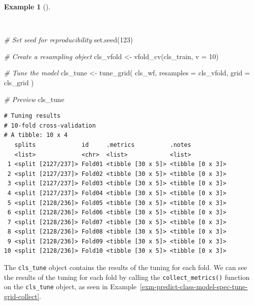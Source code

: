 \documentclass[
  letterpaper,
  krantz1]{latex/krantz-mod}
\newenvironment{Shaded}{\begin{snugshade}}{\end{snugshade}}
\newcommand{\AttributeTok}[1]{\textcolor[rgb]{0.00,0.00,0.00}{#1}}
\newcommand{\CommentTok}[1]{\textcolor[rgb]{0.00,0.00,0.00}{\textit{#1}}}
\newcommand{\DecValTok}[1]{\textcolor[rgb]{0.00,0.00,0.00}{#1}}
\newcommand{\FunctionTok}[1]{\textcolor[rgb]{0.00,0.00,0.00}{#1}}
\newcommand{\NormalTok}[1]{\textcolor[rgb]{0.00,0.00,0.00}{#1}}
\newcommand{\OtherTok}[1]{\textcolor[rgb]{0.00,0.00,0.00}{#1}}
\theoremstyle{definition}
\newtheorem{example}{Example}[chapter]
\theoremstyle{definition}
\theoremstyle{remark}
\begin{document}
\begin{example}[]\protect\hypertarget{exm-predict-class-model-spec-tune-grid-cv}{}\label{exm-predict-class-model-spec-tune-grid-cv}

~

\begin{Shaded}
\begin{Highlighting}[numbers=left,,]
\CommentTok{\# Set seed for reproducibility}
\FunctionTok{set.seed}\NormalTok{(}\DecValTok{123}\NormalTok{)}

\CommentTok{\# Create a resampling object}
\NormalTok{cls\_vfold }\OtherTok{\textless{}{-}} \FunctionTok{vfold\_cv}\NormalTok{(cls\_train, }\AttributeTok{v =} \DecValTok{10}\NormalTok{)}

\CommentTok{\# Tune the model}
\NormalTok{cls\_tune }\OtherTok{\textless{}{-}}
  \FunctionTok{tune\_grid}\NormalTok{(}
\NormalTok{    cls\_wf,}
    \AttributeTok{resamples =}\NormalTok{ cls\_vfold,}
    \AttributeTok{grid =}\NormalTok{ cls\_grid}
\NormalTok{    )}

\CommentTok{\# Preview}
\NormalTok{cls\_tune}
\end{Highlighting}
\end{Shaded}

\begin{verbatim}
# Tuning results
# 10-fold cross-validation 
# A tibble: 10 x 4
   splits             id     .metrics          .notes          
   <list>             <chr>  <list>            <list>          
 1 <split [2127/237]> Fold01 <tibble [30 x 5]> <tibble [0 x 3]>
 2 <split [2127/237]> Fold02 <tibble [30 x 5]> <tibble [0 x 3]>
 3 <split [2127/237]> Fold03 <tibble [30 x 5]> <tibble [0 x 3]>
 4 <split [2127/237]> Fold04 <tibble [30 x 5]> <tibble [0 x 3]>
 5 <split [2128/236]> Fold05 <tibble [30 x 5]> <tibble [0 x 3]>
 6 <split [2128/236]> Fold06 <tibble [30 x 5]> <tibble [0 x 3]>
 7 <split [2128/236]> Fold07 <tibble [30 x 5]> <tibble [0 x 3]>
 8 <split [2128/236]> Fold08 <tibble [30 x 5]> <tibble [0 x 3]>
 9 <split [2128/236]> Fold09 <tibble [30 x 5]> <tibble [0 x 3]>
10 <split [2128/236]> Fold10 <tibble [30 x 5]> <tibble [0 x 3]>
\end{verbatim}

\end{example}

The \texttt{cls\_tune} object contains the results of the tuning for
each fold. We can see the results of the tuning for each fold by calling
the \texttt{collect\_metrics()} function on the \texttt{cls\_tune}
object, as seen in
Example~\ref{exm-predict-class-model-spec-tune-grid-collect}.
\end{document}
